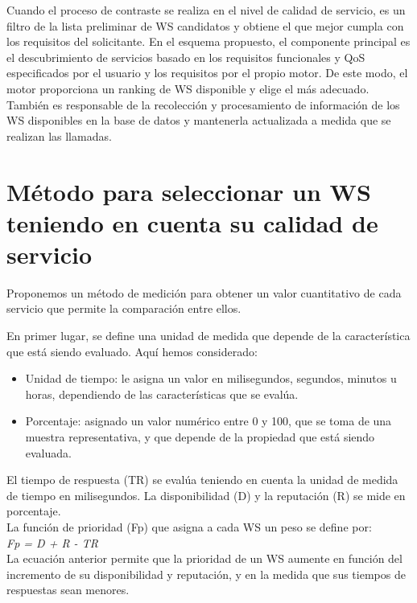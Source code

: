 Cuando el proceso de contraste se realiza en el nivel de calidad de servicio, es un filtro de la lista preliminar de WS candidatos y obtiene el que mejor cumpla con los requisitos del solicitante.
En el esquema propuesto, el componente principal es el descubrimiento de servicios basado en los requisitos funcionales y QoS especificados por el usuario y los requisitos por el propio motor. De este modo, el motor proporciona un ranking de WS disponible y elige el más adecuado. También es responsable de la recolección y procesamiento de información de los WS disponibles en la base de datos y mantenerla actualizada a medida que se realizan las llamadas.

\section{Método para seleccionar un WS teniendo en cuenta su calidad de servicio}
\label{Método para seleccionar un WS teniendo en cuenta su calidad de servicio}

Proponemos un método de medición para obtener un valor cuantitativo de cada servicio que permite la comparación entre ellos.


En primer lugar, se define una unidad de medida que depende de la característica que está siendo evaluado. Aquí hemos considerado:
\begin{itemize}
	\item Unidad de tiempo: le asigna un valor en milisegundos, segundos, minutos u horas, dependiendo de las características que se evalúa.
	\item Porcentaje: asignado un valor numérico entre 0 y 100, que se toma de una muestra representativa, y que depende de la propiedad que está siendo evaluada.
\end{itemize}
El tiempo de respuesta (TR) se evalúa teniendo en cuenta la unidad de medida de tiempo en milisegundos. La disponibilidad (D) y la reputación (R) se mide en porcentaje.\\

La función de prioridad (Fp) que asigna a cada WS un peso se define por:\\

\emph{Fp = D + R - TR}\\

La ecuación anterior permite que la prioridad de un WS aumente en función del incremento de su disponibilidad y reputación, y en la medida que sus tiempos de respuestas sean menores.\\

